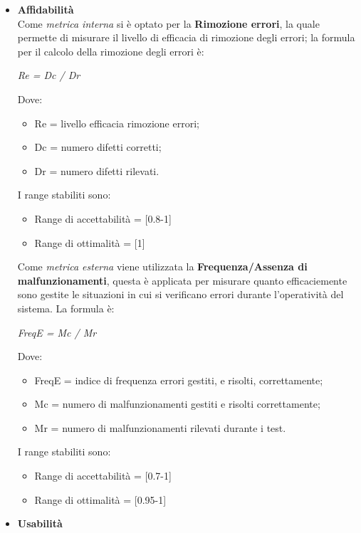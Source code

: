 \begin{itemize}
\begin{itemize}
      \end{itemize}
      \item \textbf{Affidabilità}\\
      Come \emph{metrica interna} si è optato per la \textbf{Rimozione errori},
      la quale permette di misurare il livello di efficacia di rimozione degli errori;
      la formula per il calcolo della rimozione degli errori è:
      \begin{center}
        \emph{Re = Dc / Dr}
      \end{center}
      Dove:
      \begin{itemize}
        \item Re = livello efficacia rimozione errori;
        \item Dc = numero difetti corretti;
        \item Dr = numero difetti rilevati.
      \end{itemize}
      I range stabiliti sono:
      \begin{itemize}
        \item Range di accettabilità = [0.8-1]
        \item Range di ottimalità = [1]
      \end{itemize}
      Come \emph{metrica esterna} viene utilizzata la \textbf{Frequenza/Assenza di malfunzionamenti},
      questa è applicata per misurare quanto efficaciemente sono gestite le situazioni in cui si verificano errori durante l'operatività del sistema.
      La formula è:
      \begin{center}
        \emph{FreqE = Mc / Mr}
      \end{center}
      Dove:
      \begin{itemize}
        \item FreqE = indice di frequenza errori gestiti, e risolti, correttamente;
        \item Mc = numero di malfunzionamenti gestiti e risolti correttamente;
        \item Mr = numero di malfunzionamenti rilevati durante i test.
      \end{itemize}
      I range stabiliti sono:
      \begin{itemize}
        \item Range di accettabilità = [0.7-1]
        \item Range di ottimalità = [0.95-1]
      \end{itemize}
      \item \textbf{Usabilità}\\

\end{itemize}
